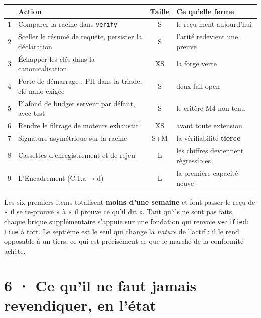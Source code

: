 \documentclass[10pt]{article}
\newcommand{\sz}[1]{{\small\color{grey}\textsf{#1}}}
\newcommand{\code}[1]{\texttt{\small #1}}
\begin{document}
\begin{center}\small
\begin{tabular}{@{}r>{\raggedright\arraybackslash}p{9.5cm}c>{\raggedright\arraybackslash}p{3.9cm}@{}}
\toprule
& \textbf{Action} & \textbf{Taille} & \textbf{Ce qu'elle ferme} \\
\midrule
1 & Comparer la racine dans \code{verify} & \sz{S} & le reçu ment aujourd'hui \\
2 & Sceller le résumé de requête, persister la déclaration & \sz{S} & l'arité redevient une preuve \\
3 & Échapper les clés dans la canonicalisation & \sz{XS} & la forge verte \\
4 & Porte de démarrage : PII dans la triade, clé nano exigée & \sz{S} & deux fail-open \\
5 & Plafond de budget serveur par défaut, avec test & \sz{S} & le critère M4 non tenu \\
6 & Rendre le filtrage de moteurs exhaustif & \sz{XS} & avant toute extension \\
\midrule
7 & Signature asymétrique sur la racine & \sz{S+M} & la vérifiabilité \textbf{tierce} \\
8 & Cassettes d'enregistrement et de rejeu & \sz{L} & les chiffres deviennent régressibles \\
9 & L'Encadrement (C.1.a$\rightarrow$d) & \sz{L} & la première capacité neuve \\
\bottomrule
\end{tabular}
\end{center}

Les six premiers items totalisent \textbf{moins d'une semaine} et font passer le reçu de « il se
re-prouve » à « il prouve ce qu'il dit ». Tant qu'ils ne sont pas faits, chaque brique supplémentaire
s'appuie sur une fondation qui renvoie \code{verified: true} à tort. Le septième est le seul qui change
la \emph{nature} de l'actif : il le rend opposable à un tiers, ce qui est précisément ce que le marché
de la conformité achète.

\enlargethispage{3.2\baselineskip}
\section{6 · Ce qu'il ne faut jamais revendiquer, en l'état}
\end{document}
